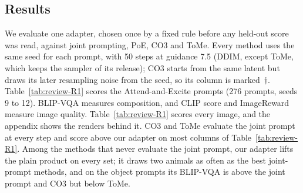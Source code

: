 \documentclass{article} %
\begin{document}

\subsection{Results}
\label{sec:results}
We evaluate one adapter, chosen once by a fixed rule before any held-out score was read, against joint prompting, PoE, CO3 and ToMe. Every method uses the same seed for each prompt, with 50 steps at guidance 7.5 (DDIM, except ToMe, which keeps the sampler of its release); CO3 starts from the same latent but draws its later resampling noise from the seed, so its column is marked~$\dagger$. Table~\ref{tab:review-R1} scores the Attend-and-Excite prompts (276 prompts, seeds 9 to 12). BLIP-VQA measures composition, and CLIP score and ImageReward measure image quality. Table~\ref{tab:review-R1} scores every image, and the appendix shows the renders behind it. CO3 and ToMe evaluate the joint prompt at every step and score above our adapter on most columns of Table~\ref{tab:review-R1}. Among the methods that never evaluate the joint prompt, our adapter lifts the plain product on every set; it draws two animals as often as the best joint-prompt methods, and on the object prompts its BLIP-VQA is above the joint prompt and CO3 but below ToMe.
\end{document}
